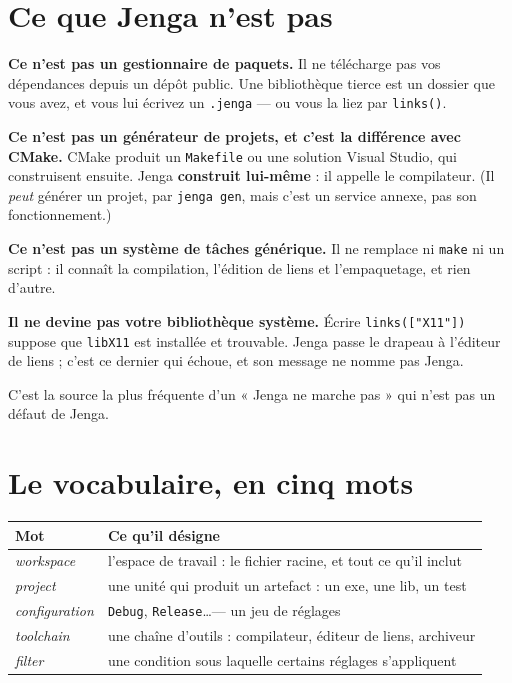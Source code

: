 \section{Ce que Jenga n'est pas}

\begin{nkretenir}
\textbf{Ce n'est pas un gestionnaire de paquets.} Il ne télécharge pas vos
dépendances depuis un dépôt public. Une bibliothèque tierce est un dossier que
vous avez, et vous lui écrivez un \texttt{.jenga} --- ou vous la liez par
\texttt{links()}.

\textbf{Ce n'est pas un générateur de projets, et c'est la différence avec
CMake.} CMake produit un \texttt{Makefile} ou une solution Visual Studio, qui
construisent ensuite. Jenga \textbf{construit lui-même} : il appelle le
compilateur. (Il \emph{peut} générer un projet, par \texttt{jenga gen}, mais
c'est un service annexe, pas son fonctionnement.)

\textbf{Ce n'est pas un système de tâches générique.} Il ne remplace ni
\texttt{make} ni un script : il connaît la compilation, l'édition de liens et
l'empaquetage, et rien d'autre.
\end{nkretenir}

\begin{nkpiege}
\textbf{Il ne devine pas votre bibliothèque système.} Écrire \texttt{links(["X11"])}
suppose que \texttt{libX11} est installée et trouvable. Jenga passe le drapeau à
l'éditeur de liens ; c'est ce dernier qui échoue, et son message ne nomme pas
Jenga.

C'est la source la plus fréquente d'un « Jenga ne marche pas » qui n'est pas un
défaut de Jenga.
\end{nkpiege}

\section{Le vocabulaire, en cinq mots}

\begin{center}
\begin{tabular}{@{}ll@{}}
\toprule
\textbf{Mot} & \textbf{Ce qu'il désigne} \\
\midrule
\emph{workspace} & l'espace de travail : le fichier racine, et tout ce qu'il inclut \\
\emph{project} & une unité qui produit un artefact : un exe, une lib, un test \\
\emph{configuration} & \texttt{Debug}, \texttt{Release}\dots --- un jeu de réglages \\
\emph{toolchain} & une chaîne d'outils : compilateur, éditeur de liens, archiveur \\
\emph{filter} & une condition sous laquelle certains réglages s'appliquent \\
\bottomrule
\end{tabular}
\end{center}

